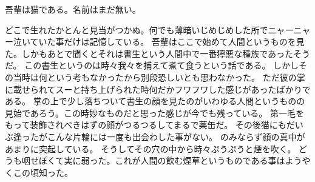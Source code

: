 \documentclass[12pt,a4paper]{ltjsarticle}
\begin{document}
吾輩は猫である。名前はまだ無い。

どこで生れたかとんと見当がつかぬ。何でも薄暗いじめじめした所でニャーニャー泣いていた事だけは記憶している。
吾輩はここで始めて人間というものを見た。しかもあとで聞くとそれは書生という人間中で一番獰悪な種族であったそうだ。
この書生というのは時々我々を捕えて煮て食うという話である。
しかしその当時は何という考もなかったから別段恐しいとも思わなかった。
ただ彼の掌に載せられてスーと持ち上げられた時何だかフワフワした感じがあったばかりである。
掌の上で少し落ちついて書生の顔を見たのがいわゆる人間というものの見始であろう。この時妙なものだと思った感じが今でも残っている。
第一毛をもって装飾されべきはずの顔がつるつるしてまるで薬缶だ。
その後猫にもだいぶ逢ったがこんな片輪には一度も出会わした事がない。
のみならず顔の真中があまりに突起している。
そうしてその穴の中から時々ぷうぷうと煙を吹く。
どうも咽せぽくて実に弱った。これが人間の飲む煙草というものである事はようやくこの頃知った。
\end{document}
